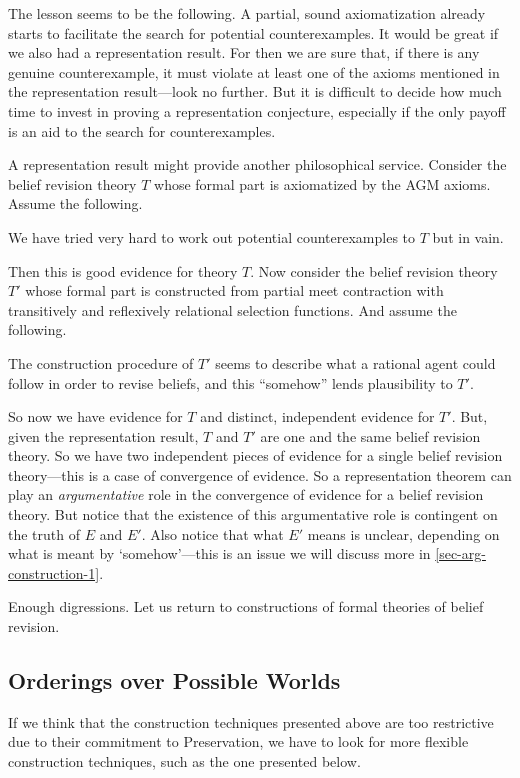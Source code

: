 The lesson seems to be the following. A partial, sound axiomatization already starts to facilitate the search for potential counterexamples. It would be great if we also had a representation result. For then we are sure that, if there is any genuine counterexample, it must violate at least one of the axioms mentioned in the representation result---look no further. But it is difficult to decide how much time to invest in proving a representation conjecture, especially if the only payoff is an aid to the search for counterexamples.

A representation result might provide another philosophical service. Consider the belief revision theory $T$ whose formal part is axiomatized by the AGM axioms. Assume the following. \op

	\im[($E$)] We have tried very hard to work out potential counterexamples to $T$ but in vain. 

\ed Then this is good evidence for theory $T$. Now consider the belief revision theory $T'$ whose formal part is constructed from partial meet contraction with transitively and reflexively relational selection functions. And assume the following. \op

	\im[($E'$)] The construction procedure of $T'$ seems to describe what a rational agent could follow in order to revise beliefs, and this ``somehow'' lends plausibility to $T'$. 

\ed So now we have evidence for $T$ and distinct, independent evidence for $T'$. But, given the representation result, $T$ and $T'$ are one and the same belief revision theory. So we have two independent pieces of evidence for a single belief revision theory---this is a case of convergence of evidence. So a representation theorem can play an {\em argumentative} role in the convergence of evidence for a belief revision theory. But notice that the existence of this argumentative role is contingent on the truth of $E$ and $E'$. Also notice that what $E'$ means is unclear, depending on what is meant by `somehow'---this is an issue we will discuss more in \autoref{sec-arg-construction-1}.

Enough digressions. Let us return to constructions of formal theories of belief revision.

\subsection{Orderings over Possible Worlds}\label{sec-ordering}

If we think that the construction techniques presented above are too restrictive due to their commitment to Preservation, we have to look for more flexible construction techniques, such as the one presented below. 

